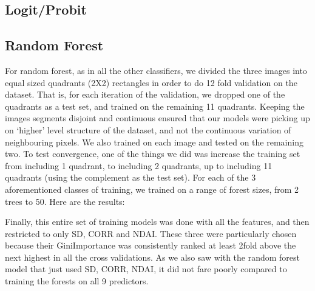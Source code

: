 \documentclass{article}\usepackage[]{graphicx}\usepackage[]{color}
\begin{document}
\subsection{Logit/Probit}

\subsection{Random Forest}

For random forest, as in all the other classifiers, we divided the three images into equal sized quadrants (2X2) rectangles in order to do 12 fold validation on the dataset.  That is, for each iteration of the validation, we dropped one of the quadrants as a test set, and trained on the remaining 11 quadrants.  Keeping the images segments disjoint and continuous ensured that our models were picking up on `higher' level structure of the dataset, and not the continuous variation of neighbouring pixels.  We also trained on each image and tested on the remaining two.  To test convergence, one of the things we did was increase the training set from including 1 quadrant, to including 2 quadrants, up to including 11 quadrants (using the complement as the test set).  For each of the 3 aforementioned classes of training, we trained on a range of forest sizes, from 2 trees to 50.     Here are the results: 

Finally, this entire set of training models was done with all the features, and then restricted to only SD, CORR and NDAI.  These three were particularly chosen because their GiniImportance was consistently ranked at least 2fold above the next highest in all the cross validations. As we also saw with the random forest model that just used SD, CORR, NDAI, it did not fare poorly compared to training the forests on all 9 predictors.  
\end{document}
